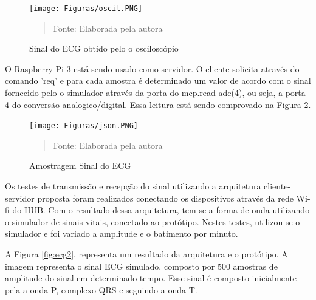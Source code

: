 \begin{figure}[H]
\begin{center}
			\caption{Sinal do ECG obtido pelo o osciloscópio}
			\texttt{[image: Figuras/oscil.PNG]}
             \vspace*{\fill} 
            \begin{quote} 
            \centering 
           Fonte: Elaborada pela autora
            \end{quote}
            \vspace*{\fill}
			\label{fig:oscilo}
\end{center}
\end{figure}

\hspace*{0.8cm}O Raspberry Pi 3 está sendo usado como servidor. O cliente solicita através do comando 'req' e para cada amostra é determinado um valor de acordo com o sinal fornecido pelo o simulador através da porta do mcp.read-adc(4), ou seja, a porta 4 do conversão analogico/digital. Essa leitura está sendo comprovado na Figura \ref{fig:kiki}.

\begin{figure}[H]
\begin{center}
			\caption{Amostragem Sinal do ECG}
			\texttt{[image: Figuras/json.PNG]}
			              						\vspace*{\fill} 
            \begin{quote} 
            \centering 
           Fonte: Elaborada pela autora
            \end{quote}
            \vspace*{\fill}
			\label{fig:kiki}
\end{center}
\end{figure}

Os testes de transmissão e recepção do sinal utilizando a arquitetura cliente-servidor proposta foram realizados conectando os dispositivos através da rede Wi-fi do HUB. Com o resultado dessa arquitetura, tem-se a forma de onda utilizando o simulador de sinais vitais, conectado ao protótipo. Nestes testes, utilizou-se o simulador e foi variado a amplitude e o batimento por minuto.

A Figura \ref{fig:ecg2}, representa um resultado da arquitetura e o protótipo. A imagem representa o sinal ECG simulado, composto por 500 amostras de amplitude do sinal em determinado tempo. Esse sinal é composto inicialmente pela a onda P, complexo QRS e seguindo a onda T. 


